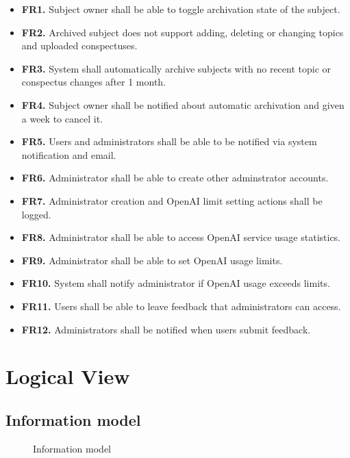\documentclass[
    english, %
]{VUMIFPSkursinis}
\begin{document}
\begin{itemize}
    \item \textbf{FR1.} Subject owner shall be able to toggle archivation state of the subject.
    \item \textbf{FR2.} Archived subject does not support adding, deleting or changing topics and uploaded conspectuses.
    \item \textbf{FR3.} System shall automatically archive subjects with no recent topic or conspectus changes after 1 month.
    \item \textbf{FR4.} Subject owner shall be notified about automatic archivation and given a week to cancel it.
    \item \textbf{FR5.} Users and administrators shall be able to be notified via system notification and email.
    \item \textbf{FR6.} Administrator shall be able to create other adminstrator accounts.
    \item \textbf{FR7.} Administrator creation and OpenAI limit setting actions shall be logged.
    \item \textbf{FR8.} Administrator shall be able to access OpenAI service usage statistics.
    \item \textbf{FR9.} Administrator shall be able to set OpenAI usage limits.
    \item \textbf{FR10.} System shall notify administrator if OpenAI usage exceeds limits.
    \item \textbf{FR11.} Users shall be able to leave feedback that administrators can access.
    \item \textbf{FR12.} Administrators shall be notified when users submit feedback.
\end{itemize}

\section{Logical View}

\subsection{Information model}

\begin{figure}[ht]
    \centering
    
    \label{informational-model}
    \caption{Information model}
\end{figure}
\end{document}
